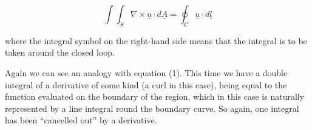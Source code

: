   \begin{equation*}\int{\int_S{\nabla \times \underline{u} \cdot 
  d\underline{A}}} = \oint_C{\underline{u} \cdot d\underline{l}} 
  \tag{12}\end{equation*} 

  \noindent{}where the integral symbol on the right-hand side means that the 
  integral is to be taken around the closed loop. 


  Again we can see an analogy with equation (1). This time we have a double 
  integral of a derivative of some kind (a curl in this case), being equal to 
  the function evaluated on the boundary of the region, which in this case is 
  naturally represented by a line integral round the boundary curve. So again, 
  one integral has been ``cancelled out'' by a derivative. 